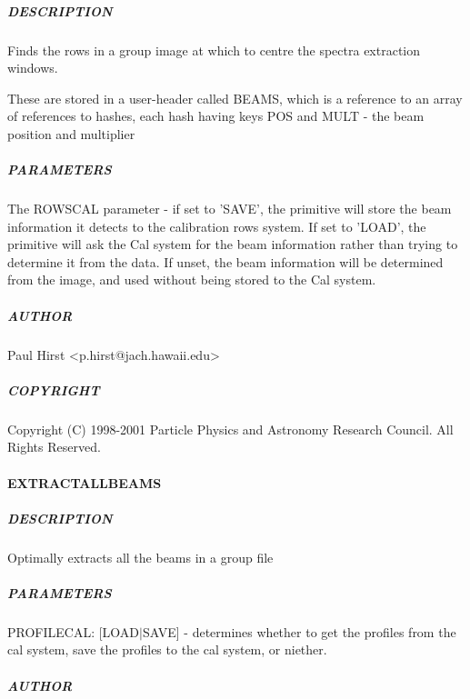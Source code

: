 \documentclass[twoside,11pt]{article}
\renewcommand{\_}{\texttt{\symbol{95}}}
\begin{document}
\subparagraph*{DESCRIPTION\label{_EXTRACT_FIND_ROWS__DESCRIPTION}}

Finds the rows in a group image at which to centre the spectra 
extraction windows.



These are stored in a user-header called BEAMS, which is a reference
to an array of references to hashes, each hash having keys POS and
MULT - the beam position and multiplier

\subparagraph*{PARAMETERS\label{_EXTRACT_FIND_ROWS__PARAMETERS}}

The ROWSCAL parameter - if set to 'SAVE', the primitive will store the
beam information it detects to the calibration rows system. If set to
'LOAD', the primitive will ask the Cal system for the beam information
rather than trying to determine it from the data. If unset, the beam
information will be determined from the image, and used without being
stored to the Cal system.

\subparagraph*{AUTHOR\label{_EXTRACT_FIND_ROWS__AUTHOR}}

Paul Hirst <p.hirst@jach.hawaii.edu>

\subparagraph*{COPYRIGHT\label{_EXTRACT_FIND_ROWS__COPYRIGHT}}

Copyright (C) 1998-2001 Particle Physics and Astronomy Research
Council. All Rights Reserved.

\paragraph*{\_EXTRACT\_ALL\_BEAMS\_\label{_EXTRACT_ALL_BEAMS_}}



\subparagraph*{DESCRIPTION\label{_EXTRACT_ALL_BEAMS__DESCRIPTION}}

Optimally extracts all the beams in a group file

\subparagraph*{PARAMETERS\label{_EXTRACT_ALL_BEAMS__PARAMETERS}}

PROFILECAL: [LOAD$|$SAVE] - determines whether to get the profiles from the cal system, save the profiles to the cal system, or niether.

\subparagraph*{AUTHOR\label{_EXTRACT_ALL_BEAMS__AUTHOR}}
\end{document}
